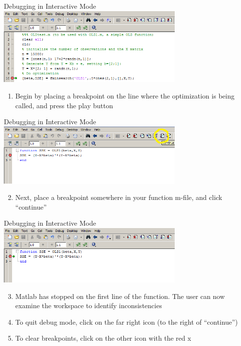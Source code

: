 \documentclass[english,xcolor=dvipsnames]{beamer}
\begin{document}
\begin{frame}[fragile]{Debugging in Interactive Mode}
\centering
\includegraphics[width=0.70\textwidth]{dbscreen1.png}\\
\begin{enumerate}
	\item Begin by placing a breakpoint on the line where the optimization is being called, and press the play button
\end{enumerate}
\end{frame}

\begin{frame}[fragile]{Debugging in Interactive Mode}
\centering
\includegraphics[width=0.70\textwidth]{dbscreen2.png}\\
\begin{enumerate}
\setcounter{enumi}{1}
	\item Next, place a breakpoint somewhere in your function m-file, and click ``continue''
\end{enumerate}
\end{frame}

\begin{frame}[fragile]{Debugging in Interactive Mode}
\centering
\includegraphics[width=0.70\textwidth]{dbscreen3.png}\\
\begin{enumerate}
\setcounter{enumi}{2}
	\item Matlab has stopped on the first line of the function. The user can now examine the workspace to identify inconsistencies
	\item To quit debug mode, click on the far right icon (to the right of ``continue'')
	\item To clear breakpoints, click on the other icon with the red x
\end{enumerate}
\end{frame}
\end{document}

